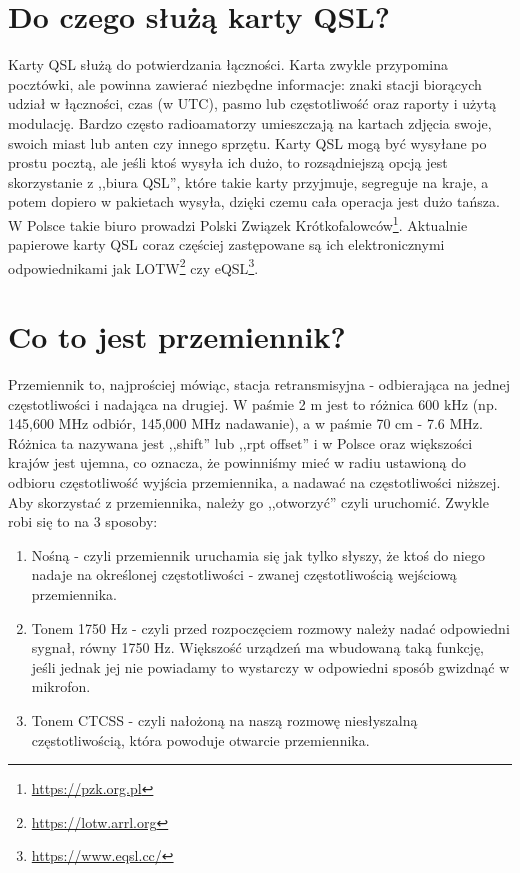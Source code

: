 \documentclass[a4paper,12pt]{article}
\begin{document}
\section{Do czego służą karty QSL?}
Karty QSL służą do potwierdzania łączności. Karta zwykle przypomina pocztówki, ale powinna zawierać niezbędne informacje: znaki stacji biorących udział w łączności, czas (w UTC), pasmo lub częstotliwość oraz raporty i użytą modulację. Bardzo często radioamatorzy umieszczają na kartach zdjęcia swoje, swoich miast lub anten czy innego sprzętu. Karty QSL mogą być wysyłane po prostu pocztą, ale jeśli ktoś wysyła ich dużo, to rozsądniejszą opcją jest skorzystanie z ,,biura QSL'', które takie karty przyjmuje, segreguje na kraje, a potem dopiero w pakietach wysyła, dzięki czemu cała operacja jest dużo tańsza. W Polsce takie biuro prowadzi Polski Związek Krótkofalowców\footnote{\url{https://pzk.org.pl}}. Aktualnie papierowe karty QSL coraz częściej zastępowane są ich elektronicznymi odpowiednikami jak LOTW\footnote{\url{https://lotw.arrl.org}} czy eQSL\footnote{\url{https://www.eqsl.cc/}}. 

\section{Co to jest przemiennik?}
Przemiennik to, najprościej mówiąc, stacja retransmisyjna - odbierająca na jednej częstotliwości i nadająca na drugiej. W paśmie 2 m jest to różnica 600 kHz (np. 145,600 MHz odbiór, 145,000 MHz nadawanie), a w paśmie 70 cm - 7.6 MHz. Różnica ta nazywana jest ,,shift'' lub ,,rpt offset'' i w Polsce oraz większości krajów jest ujemna, co oznacza, że powinniśmy mieć w radiu ustawioną do odbioru częstotliwość wyjścia przemiennika, a nadawać na częstotliwości niższej. Aby skorzystać z przemiennika, należy go ,,otworzyć'' czyli uruchomić. Zwykle robi się to na 3 sposoby:

\begin{enumerate}
 \item Nośną - czyli przemiennik uruchamia się jak tylko słyszy, że ktoś do niego nadaje na określonej częstotliwości - zwanej częstotliwością wejściową przemiennika.
 \item Tonem 1750 Hz - czyli przed rozpoczęciem rozmowy należy nadać odpowiedni sygnał, równy 1750 Hz. Większość urządzeń ma wbudowaną taką funkcję, jeśli jednak jej nie powiadamy to wystarczy w odpowiedni sposób gwizdnąć w mikrofon.
 \item Tonem CTCSS - czyli nałożoną na naszą rozmowę niesłyszalną częstotliwością, która powoduje otwarcie przemiennika.
\end{enumerate}
\end{document}
